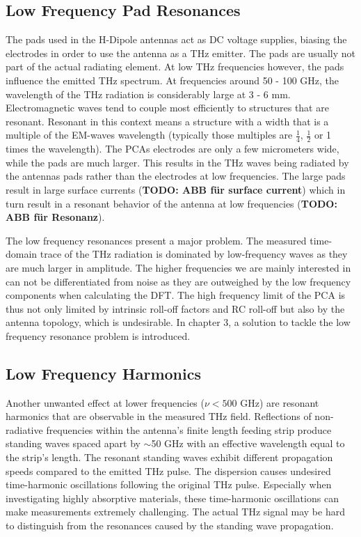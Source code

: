 \subsection{Low Frequency Pad Resonances}
The pads used in the H-Dipole antennas act as DC voltage supplies, biasing the electrodes in order to use the antenna as a THz emitter. The pads are usually not part of the actual radiating element. At low THz frequencies however, the pads influence the emitted THz spectrum. At frequencies around \num{50} - \num{100} \si{\giga \hertz}, the wavelength of the THz radiation is considerably large at \num{3} - \num{6} \si{\milli \meter}. Electromagnetic waves tend to couple most efficiently to structures that are resonant. Resonant in this context means a structure with a width that is a multiple of the EM-waves wavelength (typically those multiples are $\frac{1}{4}$, $\frac{1}{2}$ or \num{1} times the wavelength). The PCAs electrodes are only a few micrometers wide, while the pads are much larger. This results in the THz waves being radiated by the antennas pads rather than the electrodes at low frequencies. The large pads result in large surface currents (\textbf{TODO: ABB für surface current}) which in turn result in a resonant behavior of the antenna at low frequencies (\textbf{TODO: ABB für Resonanz}). 

The low frequency resonances present a major problem. The measured time-domain trace of the THz radiation is dominated by low-frequency waves as they are much larger in amplitude. The higher frequencies we are mainly interested in can not be differentiated from noise as they are outweighed by the low frequency components when calculating the DFT. The high frequency limit of the PCA is thus not only limited by intrinsic roll-off factors and RC roll-off but also by the antenna topology, which is undesirable. In chapter 3, a solution to tackle the low frequency resonance problem is introduced.

\subsection{Low Frequency Harmonics}
Another unwanted effect at lower frequencies ($\nu < 500$ \si{\giga \hertz}) are resonant harmonics that are observable in the measured THz field. Reflections of non-radiative frequencies within the antenna's finite length feeding strip produce standing waves spaced apart by $\sim$\num{50} \si{\giga \hertz} with an effective wavelength equal to the strip's length. The resonant standing waves exhibit different propagation speeds compared to the emitted THz pulse. The dispersion causes undesired time-harmonic oscillations following the original THz pulse. Especially when investigating highly absorptive materials, these time-harmonic oscillations can make measurements extremely challenging. The actual THz signal may be hard to distinguish from the resonances caused by the standing wave propagation. 

